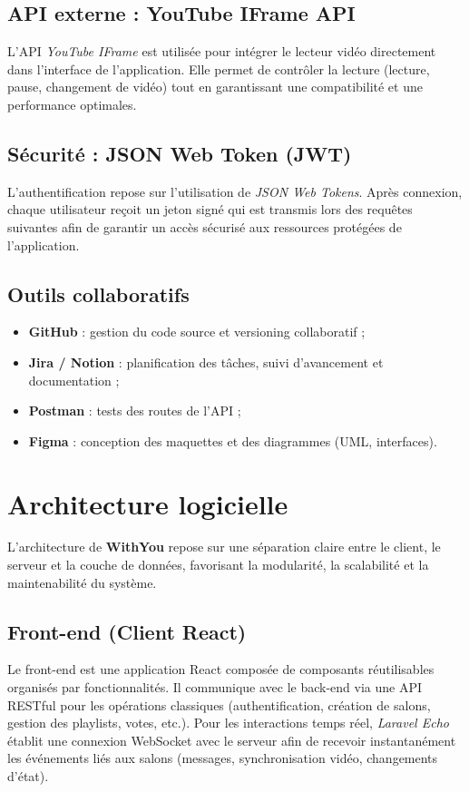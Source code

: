 \documentclass[12pt,a4paper]{report}
\begin{document}
\subsection{API externe : YouTube IFrame API}
L’API \textit{YouTube IFrame} est utilisée pour intégrer le lecteur vidéo directement dans l’interface de l’application. Elle permet de contrôler la lecture (lecture, pause, changement de vidéo) tout en garantissant une compatibilité et une performance optimales.

\subsection{Sécurité : JSON Web Token (JWT)}
L’authentification repose sur l’utilisation de \textit{JSON Web Tokens}. Après connexion, chaque utilisateur reçoit un jeton signé qui est transmis lors des requêtes suivantes afin de garantir un accès sécurisé aux ressources protégées de l’application.

\subsection{Outils collaboratifs}
\begin{itemize}
  \item \textbf{GitHub} : gestion du code source et versioning collaboratif ;
  \item \textbf{Jira / Notion} : planification des tâches, suivi d’avancement et documentation ;
  \item \textbf{Postman} : tests des routes de l’API ;
  \item \textbf{Figma} : conception des maquettes et des diagrammes (UML, interfaces).
\end{itemize}

\section{Architecture logicielle}

L’architecture de \textbf{WithYou} repose sur une séparation claire entre le client, le serveur et la couche de données, favorisant la modularité, la scalabilité et la maintenabilité du système.

\subsection{Front-end (Client React)}
Le front-end est une application React composée de composants réutilisables organisés par fonctionnalités. Il communique avec le back-end via une API RESTful pour les opérations classiques (authentification, création de salons, gestion des playlists, votes, etc.).  
Pour les interactions temps réel, \textit{Laravel Echo} établit une connexion WebSocket avec le serveur afin de recevoir instantanément les événements liés aux salons (messages, synchronisation vidéo, changements d’état).
\end{document}
